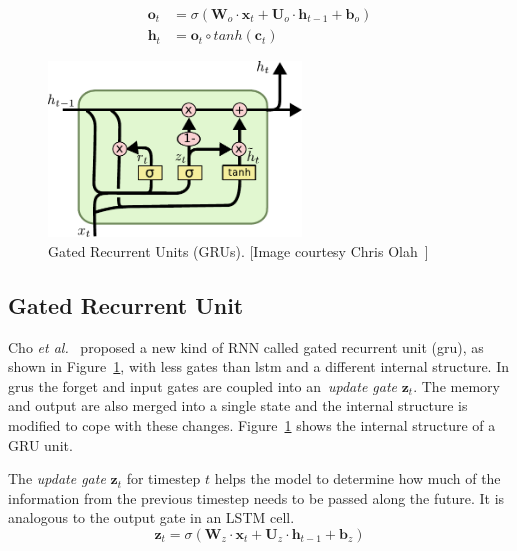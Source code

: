 \begin{equation}\label{eq:LSTM_output_gate}
\begin{split}
\mathbf{o}_t &= \sigma\left(\mathbf{W}_o \cdot \mathbf{x}_t + \mathbf{U}_o \cdot \mathbf{h}_{t-1} + \mathbf{b}_o \right)\\
\mathbf{h}_t &= \mathbf{o}_t \circ tanh \left(\mathbf{c}_t\right)
\end{split}
\end{equation}


\begin{figure}
	\centering
	\includegraphics[width=0.6\textwidth]{figures/GRU.pdf}
	\caption[Gated Recurrent Units (GRUs)]
	{Gated Recurrent Units (GRUs). [Image courtesy Chris Olah~\cite{colah_15}]\label{fig:GRU}}
\end{figure}

\subsection{Gated Recurrent Unit}\label{sec:GRU}
Cho \textit{et al.}~\cite{Cho_14} proposed a new kind of RNN called gated recurrent unit (\gls{gru}), as shown in Figure~\ref{fig:GRU}, with less gates than \gls{lstm} and a different internal structure. In \gls{gru}s the forget and input gates are coupled into an~\emph{update gate} $\mathbf{z}_t$.  The memory and output are also merged into a single state and the internal structure is modified to cope with these changes. Figure~\ref{fig:GRU} shows the internal structure of a GRU unit.

The \textit{update gate} $\mathbf{z}_t$ for timestep $t$ helps the model to determine how much of the information from the previous timestep needs to be passed along the future.  It is analogous to the output gate in an LSTM cell.
\begin{equation}
\mathbf{z}_t = \sigma \left(\mathbf{W}_z \cdot \mathbf{x}_t + \mathbf{U}_z \cdot \mathbf{h}_{t-1} + \mathbf{b}_z\right)
\end{equation}

